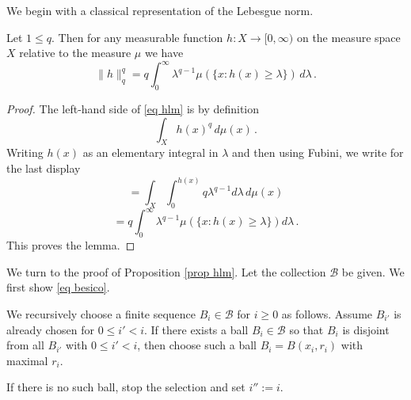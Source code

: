 We begin with a classical representation of the Lebesgue norm. 
\begin{lemma}\label{lem layercake}
Let $1\le q$.  Then for any measurable function $h:X\to [0,\infty)$ on the measure space $X$
relative to the measure $\mu$
we have
\begin{equation}\label{eq layercake}
    \|h\|_q^q=q\int_0^\infty \lambda^{q-1}\mu(\{x: h(x)\ge \lambda\})\, d\lambda\, .
\end{equation}
\end{lemma}
\begin{proof}
    The left-hand side of \eqref{eq hlm} is by definition
\begin{equation}
    \int_X h(x)^q \, d\mu(x)\, .\end{equation}
    Writing $h(x)$ as an elementary integral in $\lambda$ and then using Fubini, we write for the last display
    \begin{equation}
    =\int_X \int _0^{h(x)}
    q \lambda^{q-1} d\lambda\, d\mu(x)
\end{equation}
\begin{equation}
    =q\int _0^{\infty}
    \lambda^{q-1} \mu(\{x: h(x)\ge \lambda\}) d\lambda\, .
\end{equation}
This proves the lemma.
\end{proof}

We turn to the proof of Proposition \ref{prop hlm}. 
Let the collection $\mathcal{B}$ be given.
We first show \eqref{eq besico}.



We recursively choose a finite sequence $B_i\in \mathcal{B}$
for $i\ge 0$ as follows. Assume $B_{i'}$
is already chosen for $0\le i'<i$.
If there exists a ball $B_{i}\in \mathcal{B}$ so that $B_{i}$
is disjoint from all $B_{i'}$
with $0\le i'<i$, then choose
such a ball $B_i=B(x_i,r_i)$ with maximal $r_i$.

If there is no such ball, stop the selection and set
$i'':=i$.

